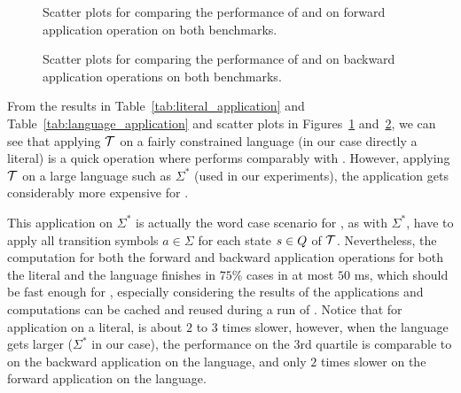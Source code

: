 \begin{figure}[ht]
    \centering
    \quad
    \caption{
      Scatter plots for comparing the performance of \mata and \mona on forward application operation on both benchmarks.
    }
    \label{fig:apply_operation}%
\end{figure}

\begin{figure}[ht]
    \centering
    \quad
    \caption{
      Scatter plots for comparing the performance of \mata and \mona on backward application operations on both benchmarks.
    }
    \label{fig:apply_operation_backward}%
\end{figure}

From the results in Table~\ref{tab:literal_application} and Table~\ref{tab:language_application} and scatter plots in Figures~\ref{fig:apply_operation} and~\ref{fig:apply_operation_backward}, we can see that applying $\mathcal{T}$ on a fairly constrained language (in our case directly a literal) is a quick operation where \mata performs comparably with \mona.
However, applying $\mathcal{T}$ on a large language such as $\Sigma^*$ (used in our experiments), the application gets considerably more expensive for \mata.

This application on $\Sigma^*$ is actually the word case scenario for \mata, as with $\Sigma^*$, \mata have to apply all transition symbols $a \in \Sigma$ for each state $s \in Q$ of $\mathcal{T}$.
Nevertheless, the computation for both the forward and backward application operations for both the literal and the language finishes in $75\%$ cases in at most $50$ ms, which should be fast enough for \noodler, especially considering the results of the applications and computations can be cached and reused during a run of \noodler.
Notice that for application on a literal, \mata is about $2$ to $3$ times slower, however, when the language gets larger ($\Sigma^*$ in our case), the performance on the 3rd quartile is comparable to \mona on the backward application on the language, and only $2$ times slower on the forward application on the language.

